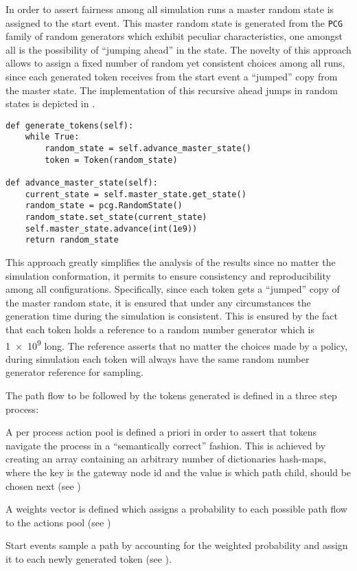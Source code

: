 In order to assert fairness among all simulation runs a master random state is assigned to the start event. This master random state is generated from the \texttt{PCG} family of random generators which exhibit peculiar characteristics, one amongst all is the possibility of ``jumping ahead'' in the state. The novelty of this approach allows to assign a fixed number of random yet consistent choices among all runs, since each generated token receives from the start event a ``jumped'' copy from the master state. The implementation of this recursive ahead jumps in random states is depicted in .

\begin{lstlisting}[caption=Random state advancement method which initially copies the current state of the master random state. It then creates a new random state and sets its state to the former copy then eventually advances the master random state by \num{1e9} units.,label=lst:random_state_jump,style=CustomPython]
def generate_tokens(self):
    while True:
        random_state = self.advance_master_state()
        token = Token(random_state)

def advance_master_state(self):
    current_state = self.master_state.get_state()
    random_state = pcg.RandomState()
    random_state.set_state(current_state)
    self.master_state.advance(int(1e9))
    return random_state
\end{lstlisting}

This approach greatly simplifies the analysis of the results since no matter the simulation conformation, it permits to ensure consistency and reproducibility among all configurations. Specifically, since each token gets a ``jumped'' copy of the master random state, it is ensured that under any circumstances the generation time during the simulation is consistent. This is ensured by the fact that each token holds a reference to a random number generator which is \num{1e9} long. The reference asserts that no matter the choices made by a policy, during simulation each token will always have the same random number generator reference for sampling.

The path flow to be followed by the tokens generated is defined in a three step process:
\begin{enumerate*}
    \item A per process action pool is defined a priori in order to assert that tokens navigate the process in a ``semantically correct'' fashion. This is achieved by creating an array containing an arbitrary number of dictionaries \ie hash-maps, where the key is the gateway node id and the value is which path \ie child, should be chosen next (see )
    \item A weights vector is defined which assigns a probability to each possible path flow to the actions pool (see )
    \item Start events sample a path by accounting for the weighted probability and assign it to each newly generated token (see ).
\end{enumerate*}

